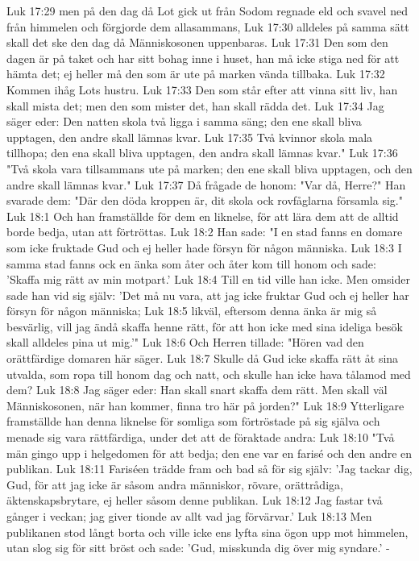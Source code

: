 Luk 17:29  men på den dag då Lot gick ut från Sodom regnade eld och svavel ned från himmelen och förgjorde dem allasammans,
Luk 17:30  alldeles på samma sätt skall det ske den dag då Människosonen uppenbaras.
Luk 17:31  Den som den dagen är på taket och har sitt bohag inne i huset, han må icke stiga ned för att hämta det; ej heller må den som är ute på marken vända tillbaka.
Luk 17:32  Kommen ihåg Lots hustru.
Luk 17:33  Den som står efter att vinna sitt liv, han skall mista det; men den som mister det, han skall rädda det.
Luk 17:34  Jag säger eder: Den natten skola två ligga i samma säng; den ene skall bliva upptagen, den andre skall lämnas kvar.
Luk 17:35  Två kvinnor skola mala tillhopa; den ena skall bliva upptagen, den andra skall lämnas kvar."
Luk 17:36  "Två skola vara tillsammans ute på marken; den ene skall bliva upptagen, och den andre skall lämnas kvar."
Luk 17:37  Då frågade de honom: "Var då, Herre?" Han svarade dem: "Där den döda kroppen är, dit skola ock rovfåglarna församla sig."
Luk 18:1  Och han framställde för dem en liknelse, för att lära dem att de alltid borde bedja, utan att förtröttas.
Luk 18:2  Han sade: "I en stad fanns en domare som icke fruktade Gud och ej heller hade försyn för någon människa.
Luk 18:3  I samma stad fanns ock en änka som åter och åter kom till honom och sade: 'Skaffa mig rätt av min motpart.'
Luk 18:4  Till en tid ville han icke. Men omsider sade han vid sig själv: 'Det må nu vara, att jag icke fruktar Gud och ej heller har försyn för någon människa;
Luk 18:5  likväl, eftersom denna änka är mig så besvärlig, vill jag ändå skaffa henne rätt, för att hon icke med sina ideliga besök skall alldeles pina ut mig.'"
Luk 18:6  Och Herren tillade: "Hören vad den orättfärdige domaren här säger.
Luk 18:7  Skulle då Gud icke skaffa rätt åt sina utvalda, som ropa till honom dag och natt, och skulle han icke hava tålamod med dem?
Luk 18:8  Jag säger eder: Han skall snart skaffa dem rätt. Men skall väl Människosonen, när han kommer, finna tro här på jorden?"
Luk 18:9  Ytterligare framställde han denna liknelse för somliga som förtröstade på sig själva och menade sig vara rättfärdiga, under det att de föraktade andra:
Luk 18:10  "Två män gingo upp i helgedomen för att bedja; den ene var en farisé och den andre en publikan.
Luk 18:11  Fariséen trädde fram och bad så för sig själv: 'Jag tackar dig, Gud, för att jag icke är såsom andra människor, rövare, orättrådiga, äktenskapsbrytare, ej heller såsom denne publikan.
Luk 18:12  Jag fastar två gånger i veckan; jag giver tionde av allt vad jag förvärvar.'
Luk 18:13  Men publikanen stod långt borta och ville icke ens lyfta sina ögon upp mot himmelen, utan slog sig för sitt bröst och sade: 'Gud, misskunda dig över mig syndare.' -
